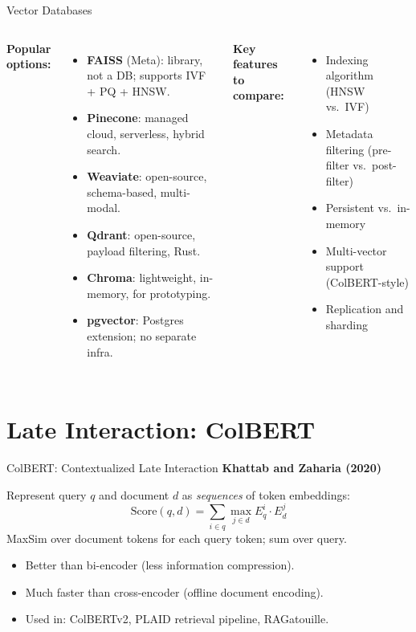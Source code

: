 \documentclass[aspectratio=169,10pt]{beamer}
\begin{document}
\begin{frame}{Vector Databases}
  \begin{columns}[T]
      \textbf{Popular options:}
      \begin{itemize}
        \item \textbf{FAISS} (Meta): library, not a DB; supports IVF + PQ + HNSW.
        \item \textbf{Pinecone}: managed cloud, serverless, hybrid search.
        \item \textbf{Weaviate}: open-source, schema-based, multi-modal.
        \item \textbf{Qdrant}: open-source, payload filtering, Rust.
        \item \textbf{Chroma}: lightweight, in-memory, for prototyping.
        \item \textbf{pgvector}: Postgres extension; no separate infra.
      \end{itemize}
      \textbf{Key features to compare:}
      \begin{itemize}
        \item Indexing algorithm (HNSW vs.\ IVF)
        \item Metadata filtering (pre-filter vs.\ post-filter)
        \item Persistent vs.\ in-memory
        \item Multi-vector support (ColBERT-style)
        \item Replication and sharding
      \end{itemize}
  \end{columns}
\end{frame}

\section{Late Interaction: ColBERT}

\begin{frame}{ColBERT: Contextualized Late Interaction}
  \textbf{Khattab and Zaharia (2020)}~\cite{khattab2020colbert}
  \vspace{0.4em}
  \begin{tcolorbox}[hitbox, title=Late Interaction Scoring]
    Represent query $q$ and document $d$ as \emph{sequences} of token embeddings:
    \[
      \text{Score}(q, d) = \sum_{i \in q} \max_{j \in d} E_q^i \cdot E_d^j
    \]
    MaxSim over document tokens for each query token; sum over query.
  \end{tcolorbox}
  \vspace{0.3em}
  \begin{itemize}
    \item Better than bi-encoder (less information compression).
    \item Much faster than cross-encoder (offline document encoding).
    \item Used in: ColBERTv2, PLAID retrieval pipeline, RAGatouille.
  \end{itemize}
\end{frame}
\end{document}
